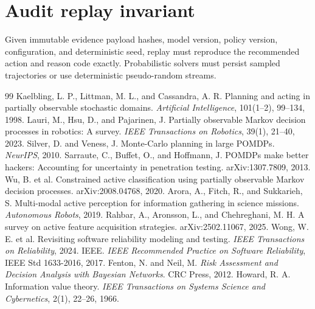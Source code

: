 \documentclass[11pt]{article}
\begin{document}
\section{Audit replay invariant}
Given immutable evidence payload hashes, model version, policy version, configuration, and deterministic seed, replay must reproduce the recommended action and reason code exactly. Probabilistic solvers must persist sampled trajectories or use deterministic pseudo-random streams.
\begin{thebibliography}{99}
 Kaelbling, L. P., Littman, M. L., and Cassandra, A. R. Planning and acting in partially observable stochastic domains. \emph{Artificial Intelligence}, 101(1--2), 99--134, 1998.
 Lauri, M., Hsu, D., and Pajarinen, J. Partially observable Markov decision processes in robotics: A survey. \emph{IEEE Transactions on Robotics}, 39(1), 21--40, 2023.
 Silver, D. and Veness, J. Monte-Carlo planning in large POMDPs. \emph{NeurIPS}, 2010.
 Sarraute, C., Buffet, O., and Hoffmann, J. POMDPs make better hackers: Accounting for uncertainty in penetration testing. arXiv:1307.7809, 2013.
 Wu, B. et al. Constrained active classification using partially observable Markov decision processes. arXiv:2008.04768, 2020.
 Arora, A., Fitch, R., and Sukkarieh, S. Multi-modal active perception for information gathering in science missions. \emph{Autonomous Robots}, 2019.
 Rahbar, A., Aronsson, L., and Chehreghani, M. H. A survey on active feature acquisition strategies. arXiv:2502.11067, 2025.
 Wong, W. E. et al. Revisiting software reliability modeling and testing. \emph{IEEE Transactions on Reliability}, 2024.
 IEEE. \emph{IEEE Recommended Practice on Software Reliability}, IEEE Std 1633-2016, 2017.
 Fenton, N. and Neil, M. \emph{Risk Assessment and Decision Analysis with Bayesian Networks}. CRC Press, 2012.
 Howard, R. A. Information value theory. \emph{IEEE Transactions on Systems Science and Cybernetics}, 2(1), 22--26, 1966.
\end{thebibliography}
\end{document}
